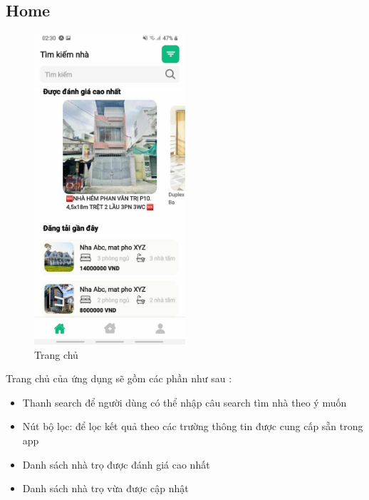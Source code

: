 \subsection{Home}
\begin{figure}[H]
    \centering
    \includegraphics[width=0.5\textwidth]{Images/app_image/app_9.jpg}
    \caption{Trang chủ}
\end{figure}
Trang chủ của ứng dụng sẽ gồm các phần như sau :
\begin{itemize}
    \item Thanh search để người dùng có thể nhập câu search tìm nhà theo ý muốn
    \item Nút bộ lọc: để lọc kết quả theo các trường thông tin được cung cấp sẵn trong app
    \item Danh sách nhà trọ được đánh giá cao nhất
    \item Danh sách nhà trọ vừa được cập nhật
\end{itemize}
